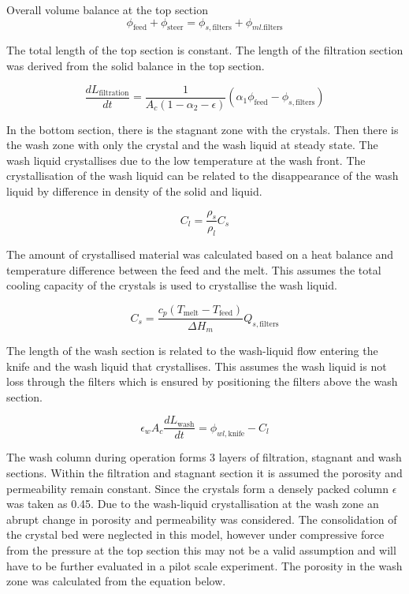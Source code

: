 Overall volume balance at the top section 
\begin{equation}
\phi_{\mathrm{feed}}+\phi_{\mathrm{steer}}=\phi_{s,\mathrm{filters}}+\phi_{ml.\mathrm{filters}}
\end{equation}

The total length of the top section is constant. The length of the filtration section was derived from the solid balance in the top section. 

\begin{equation}
\frac{dL_{\mathrm{filtration}}}{dt} = \frac{1}{A_c(1-\alpha_2-\epsilon)}(\alpha_1\phi_{\mathrm{feed}}-\phi_{s,\mathrm{filters}})
\end{equation}

In the bottom section, there is the stagnant zone with the crystals. Then there is the wash zone with only the crystal and the wash liquid at steady state. The wash liquid crystallises due to the low temperature at the wash front. The crystallisation of the wash liquid can be related to the disappearance of the wash liquid by difference in density of the solid and liquid.

\begin{equation}
C_l= \frac{\rho_s}{\rho_l}C_s
\end{equation}

The amount of crystallised material was calculated based on a heat balance and temperature difference between the feed and the melt. This assumes the total cooling capacity of the crystals is used to crystallise the wash liquid. 

\begin{equation}
C_s= \frac{c_p(T_{\mathrm{melt}}-T_{\mathrm{feed}})}{\Delta H_m}Q_{s,\mathrm{filters}}
\end{equation}

The length of the wash section is related to the wash-liquid flow entering the knife and the wash liquid that crystallises. This assumes the wash liquid is not loss through the filters which is ensured by positioning the filters above the wash section.

\begin{equation}
\epsilon_w A_c \frac{dL_{\mathrm{wash}}}{dt}= \phi_{wl,\mathrm{knife}}-C_l
\end{equation}

The wash column during operation forms 3 layers of filtration, stagnant and wash sections. Within the filtration and stagnant section it is assumed the porosity and permeability remain constant. Since the crystals form a densely packed column $\epsilon$ was taken as 0.45. Due to the wash-liquid crystallisation at the wash zone an abrupt change in porosity and permeability was considered. The consolidation of the crystal bed were neglected in this model, however under compressive force from the pressure at the top section this may not be a valid assumption and will have to be further evaluated in a pilot scale experiment. The porosity in the wash zone was calculated from the equation below. 

